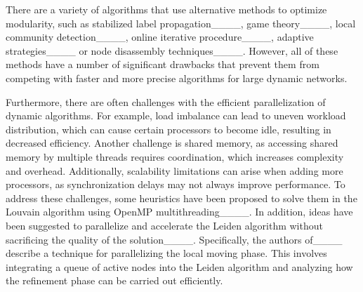 There are a variety of algorithms that use alternative methods to optimize modularity, such as stabilized label propagation____, game theory____, local community detection____, online iterative procedure____, adaptive strategies____ or node disassembly techniques____. However, all of these methods have a number of significant drawbacks that prevent them from competing with faster and more precise algorithms for large dynamic networks.

Furthermore, there are often challenges with the efficient parallelization of dynamic algorithms. For example, load imbalance can lead to uneven workload distribution, which can cause certain processors to become idle, resulting in decreased efficiency. Another challenge is shared memory, as accessing shared memory by multiple threads requires coordination, which increases complexity and overhead. Additionally, scalability limitations can arise when adding more processors, as synchronization delays may not always improve performance. To address these challenges, some heuristics have been proposed to solve them in the Louvain algorithm using OpenMP multithreading____. In addition, ideas have been suggested to parallelize and accelerate the Leiden algorithm without sacrificing the quality of the solution____. Specifically, the authors of____ describe a technique for parallelizing the local moving phase. This involves integrating a queue of active nodes into the Leiden algorithm and analyzing how the refinement phase can be carried out efficiently.

